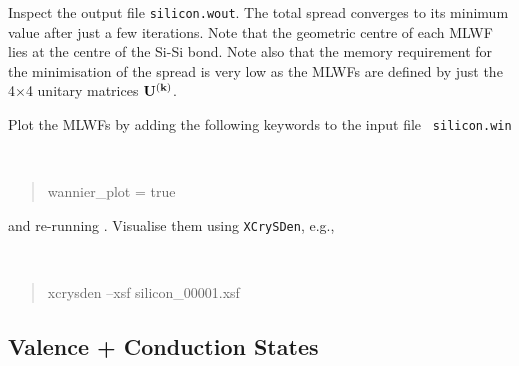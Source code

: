 \documentclass[a4paper,11pt,twoside]{article}
\begin{document}
Inspect the output file {\tt silicon.wout}. The total spread converges to its
minimum value after just a few iterations. Note that the geometric centre of
each MLWF lies at the centre of the Si-Si bond.
Note also that the memory requirement for the minimisation of
the spread is very low as the MLWFs are defined 
by just the 4$\times$4 unitary matrices $\mathbf{U}^{(\mathbf{k})}$. 

Plot the MLWFs by adding the following keywords to the input file {\tt
  silicon.win} 
{\tt
\begin{quote}
wannier\_plot = true
\end{quote} }
and re-running \wannier. Visualise them using {\tt XCrySDen}, e.g.,
{\tt
\begin{quote}
xcrysden --xsf silicon\_00001.xsf
\end{quote} }

\subsection*{Valence + Conduction States}
\end{document}
